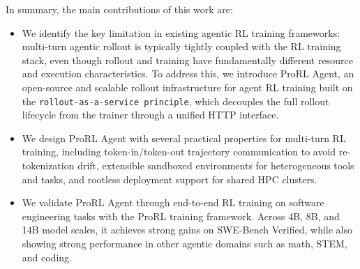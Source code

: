 In summary, the main contributions of this work are:
\begin{itemize}
    \item We identify the key limitation in existing agentic RL training frameworks: multi-turn agentic rollout is typically tightly coupled with the RL training stack, even though rollout and training have fundamentally different resource and execution characteristics. To address this, we introduce ProRL Agent, an open-source and scalable rollout infrastructure for agent RL training built on the \texttt{rollout-as-a-service principle}, which decouples the full rollout lifecycle from the trainer through a unified HTTP interface.
    \item We design ProRL Agent with several practical properties for multi-turn RL training, including token-in/token-out trajectory communication to avoid re-tokenization drift, extensible sandboxed environments for heterogeneous tools and tasks, and rootless deployment support for shared HPC clusters.
    \item We validate ProRL Agent through end-to-end RL training on software engineering tasks with the ProRL training framework. Across 4B, 8B, and 14B model scales, it achieves strong gains on SWE-Bench Verified, while also showing strong performance in other agentic domains such as math, STEM, and coding.
\end{itemize}


